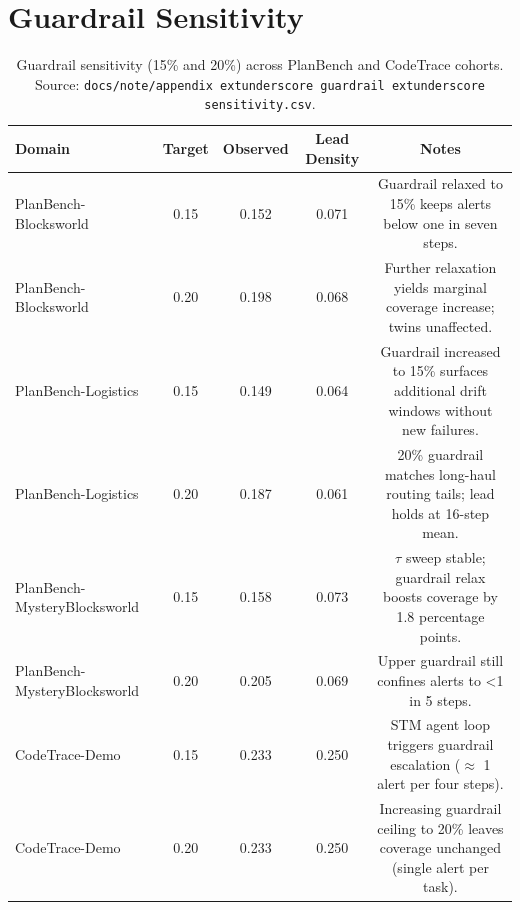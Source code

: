 \documentclass[11pt]{article}
\begin{document}
\section{Guardrail Sensitivity}
\label{app:guardrail}
\begin{table}[h]
  \centering
  \caption{Guardrail sensitivity (15\% and 20\%) across PlanBench and CodeTrace cohorts. Source: \texttt{docs/note/appendix	extunderscore guardrail	extunderscore sensitivity.csv}.}
  \begin{tabular}{lcccc}
    \hline
    Domain & Target & Observed & Lead Density & Notes\\
    \hline
    PlanBench-Blocksworld & 0.15 & 0.152 & 0.071 & Guardrail relaxed to 15\% keeps alerts below one in seven steps.\\
    PlanBench-Blocksworld & 0.20 & 0.198 & 0.068 & Further relaxation yields marginal coverage increase; twins unaffected.\\
    PlanBench-Logistics & 0.15 & 0.149 & 0.064 & Guardrail increased to 15\% surfaces additional drift windows without new failures.\\
    PlanBench-Logistics & 0.20 & 0.187 & 0.061 & 20\% guardrail matches long-haul routing tails; lead holds at 16-step mean.\\
    PlanBench-MysteryBlocksworld & 0.15 & 0.158 & 0.073 & $\tau$ sweep stable; guardrail relax boosts coverage by 1.8 percentage points.\\
    PlanBench-MysteryBlocksworld & 0.20 & 0.205 & 0.069 & Upper guardrail still confines alerts to <1 in 5 steps.\\
    CodeTrace-Demo & 0.15 & 0.233 & 0.250 & STM agent loop triggers guardrail escalation ($\approx$ 1 alert per four steps).\\
    CodeTrace-Demo & 0.20 & 0.233 & 0.250 & Increasing guardrail ceiling to 20\% leaves coverage unchanged (single alert per task).\\
    \hline
  \end{tabular}
\end{table}
\end{document}
